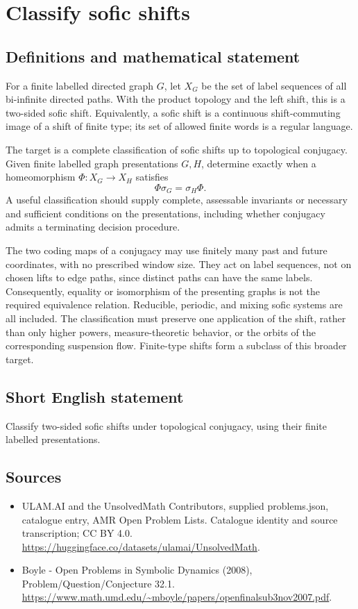 \documentclass[11pt,a4paper]{article}
\begin{document}
\section*{Classify sofic shifts}\label{statement}

\subsection{Definitions and mathematical statement}
For a finite labelled directed graph $G$, let $X_G$ be the
set of label sequences of all bi-infinite directed paths.
With the product topology and the left shift, this is a
two-sided sofic shift. Equivalently, a sofic shift is a
continuous shift-commuting image of a shift of finite type;
its set of allowed finite words is a regular language.

The target is a complete classification of sofic shifts up
to topological conjugacy. Given finite labelled graph
presentations $G,H$, determine exactly when a homeomorphism
$\Phi:X_G\to X_H$ satisfies
\[
                       \Phi\sigma_G=\sigma_H\Phi.
\]
A useful classification should supply complete, assessable
invariants or necessary and sufficient conditions on the
presentations, including whether conjugacy admits a terminating
decision procedure.

The two coding maps of a conjugacy may use finitely many
past and future coordinates, with no prescribed window size.
They act on label sequences, not on chosen lifts to edge
paths, since distinct paths can have the same labels.
Consequently, equality or isomorphism of the presenting graphs
is not the required equivalence relation. Reducible, periodic,
and mixing sofic systems are all included. The classification
must preserve one application of the shift, rather than only
higher powers, measure-theoretic behavior, or the orbits of
the corresponding suspension flow. Finite-type shifts form
a subclass of this broader target.
\subsection{Short English statement}
Classify two-sided sofic shifts under topological conjugacy, using their finite labelled presentations.
\subsection{Sources}
\begin{itemize}
\item[S1] ULAM.AI and the UnsolvedMath Contributors, supplied problems.json, catalogue entry, AMR Open Problem Lists. Catalogue identity and source transcription; CC BY 4.0.
\url{https://huggingface.co/datasets/ulamai/UnsolvedMath}.
\item[S2] Boyle - Open Problems in Symbolic Dynamics (2008), Problem/Question/Conjecture 32.1. 
\url{https://www.math.umd.edu/~mboyle/papers/openfinalsub3nov2007.pdf}.
\end{itemize}
\end{document}
